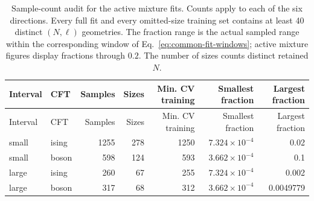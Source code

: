 \begin{longtable}{llrrrrr}
\caption{Sample-count audit for the active mixture fits. Counts apply to each of the six directions. Every full fit and every omitted-size training set contains at least 40 distinct $(N,\ell)$ geometries. The fraction range is the actual sampled range within the corresponding window of Eq.~\eqref{eq:common-fit-windows}; active mixture figures display fractions through $0.2$. The number of sizes counts distinct retained $N$.}
\label{tab:scaling-sampling}\\\toprule
Interval & CFT & Samples & Sizes & Min. CV training & Smallest fraction & Largest fraction\\\midrule
\endfirsthead
\toprule
Interval & CFT & Samples & Sizes & Min. CV training & Smallest fraction & Largest fraction\\\midrule
\endhead
\bottomrule\endfoot
small & ising & 1255 & 278 & 1250 & $7.324\!\times\!10^{-4}$ & 0.02\\
small & boson & 598 & 124 & 593 & $3.662\!\times\!10^{-4}$ & 0.1\\
large & ising & 260 & 67 & 255 & $7.324\!\times\!10^{-4}$ & 0.002\\
large & boson & 317 & 68 & 312 & $3.662\!\times\!10^{-4}$ & 0.0049779\\
\end{longtable}
